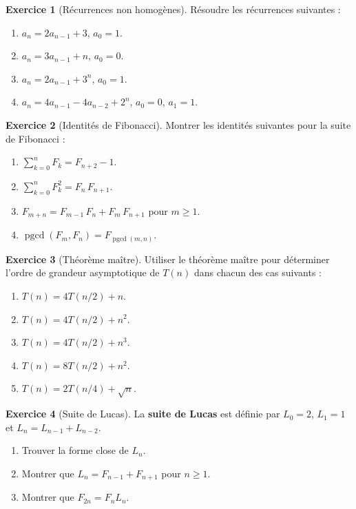 \documentclass[12pt,a4paper,openany]{book}
\theoremstyle{definition}
\newtheorem{exercice}{Exercice}[chapter]
\theoremstyle{plain}
\theoremstyle{remark}
\DeclareMathOperator{\pgcd}{pgcd}
\begin{document}
\begin{exercice}[Récurrences non homogènes]
\label{exo:rec-non-hom}
Résoudre les récurrences suivantes :
\begin{enumerate}[label=(\alph*)]
  \item $a_n = 2a_{n-1} + 3$, \quad $a_0 = 1$.
  \item $a_n = 3a_{n-1} + n$, \quad $a_0 = 0$.
  \item $a_n = 2a_{n-1} + 3^n$, \quad $a_0 = 1$.
  \item $a_n = 4a_{n-1} - 4a_{n-2} + 2^n$, \quad $a_0 = 0$, $a_1 = 1$.
\end{enumerate}
\end{exercice}

\begin{exercice}[Identités de Fibonacci]
\label{exo:fib-identites}
Montrer les identités suivantes pour la suite de Fibonacci :
\begin{enumerate}[label=(\alph*)]
  \item $\sum_{k=0}^{n} F_k = F_{n+2} - 1$.
  \item $\sum_{k=0}^{n} F_k^2 = F_n\, F_{n+1}$.
  \item $F_{m+n} = F_{m-1}\, F_n + F_m\, F_{n+1}$ pour $m \geq 1$.
  \item $\pgcd(F_m, F_n) = F_{\pgcd(m,n)}$.
\end{enumerate}
\end{exercice}

\begin{exercice}[Théorème maître]
\label{exo:maitre}
Utiliser le théorème maître pour déterminer l'ordre de grandeur asymptotique
de $T(n)$ dans chacun des cas suivants :
\begin{enumerate}[label=(\alph*)]
  \item $T(n) = 4T(n/2) + n$.
  \item $T(n) = 4T(n/2) + n^2$.
  \item $T(n) = 4T(n/2) + n^3$.
  \item $T(n) = 8T(n/2) + n^2$.
  \item $T(n) = 2T(n/4) + \sqrt{n}$.
\end{enumerate}
\end{exercice}

\begin{exercice}[Suite de Lucas]
\label{exo:lucas}
La \textbf{suite de Lucas} est définie par $L_0 = 2$, $L_1 = 1$ et
$L_n = L_{n-1} + L_{n-2}$.
\begin{enumerate}[label=(\alph*)]
  \item Trouver la forme close de $L_n$.
  \item Montrer que $L_n = F_{n-1} + F_{n+1}$ pour $n \geq 1$.
  \item Montrer que $F_{2n} = F_n L_n$.
\end{enumerate}
\end{exercice}
\end{document}
